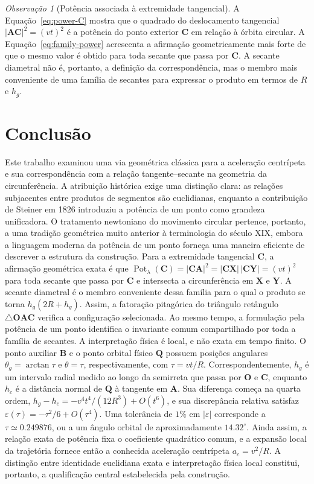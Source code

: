 \documentclass[12pt,a4paper]{article}
\newcommand{\pt}[1]{\mathbf{#1}}
\newcommand{\seglen}[1]{\lvert\mathbf{#1}\rvert}
\DeclareMathOperator{\Pot}{Pot}
\numberwithin{equation}{section}
\theoremstyle{remark}
\newtheorem{remark}{Observação}[section]
\begin{document}
\begin{remark}[Potência associada à extremidade tangencial]
\label{rem:ac-power}
A Equação~\eqref{eq:power-C} mostra que o quadrado do deslocamento tangencial $\seglen{AC}^{2}=(vt)^2$ é a potência do ponto exterior $\pt{C}$ em relação à órbita circular. A Equação~\eqref{eq:family-power} acrescenta a afirmação geometricamente mais forte de que o mesmo valor é obtido para toda secante que passa por $\pt{C}$. A secante diametral não é, portanto, a definição da correspondência, mas o membro mais conveniente de uma família de secantes para expressar o produto em termos de $R$ e $h_g$.
\end{remark}

\section{Conclusão}

Este trabalho examinou uma via geométrica clássica para a aceleração centrípeta e sua correspondência com a relação tangente--secante na geometria da circunferência. A atribuição histórica exige uma distinção clara: as relações subjacentes entre produtos de segmentos são euclidianas, enquanto a contribuição de Steiner em 1826 \cite{steiner1826einige} introduziu a potência de um ponto como grandeza unificadora. O tratamento newtoniano do movimento circular pertence, portanto, a uma tradição geométrica muito anterior à terminologia do século XIX, embora a linguagem moderna da potência de um ponto forneça uma maneira eficiente de descrever a estrutura da construção. Para a extremidade tangencial $\pt{C}$, a afirmação geométrica exata é que $\Pot_{\lambda}(\pt{C})=\seglen{CA}^{2}=\seglen{CX}\,\seglen{CY}=(vt)^2$ para toda secante que passa por $\pt{C}$ e intersecta a circunferência em $\pt{X}$ e $\pt{Y}$. A secante diametral é o membro conveniente dessa família para o qual o produto se torna $h_g(2R+h_g)$. Assim, a fatoração pitagórica do triângulo retângulo $\triangle \mathbf{OAC}$ verifica a configuração selecionada. Ao mesmo tempo, a formulação pela potência de um ponto identifica o invariante comum compartilhado por toda a família de secantes. A interpretação física é local, e não exata em tempo finito. O ponto auxiliar $\pt{B}$ e o ponto orbital físico $\pt{Q}$ possuem posições angulares $\theta_g=\arctan\tau$ e $\theta=\tau$, respectivamente, com $\tau=vt/R$. Correspondentemente, $h_g$ é um intervalo radial medido ao longo da semirreta que passa por $\pt{O}$ e $\pt{C}$, enquanto $h_c$ é a distância normal de $\pt{Q}$ à tangente em $\pt{A}$. Sua diferença começa na quarta ordem, $h_g-h_c=-v^4t^4/(12R^3)+O(t^6)$, e sua discrepância relativa satisfaz $\varepsilon(\tau)=-\tau^2/6+O(\tau^4)$. Uma tolerância de $1\%$ em $|\varepsilon|$ corresponde a $\tau\simeq0.249876$, ou a um ângulo orbital de aproximadamente $14.32^{\circ}$. Ainda assim, a relação exata de potência fixa o coeficiente quadrático comum, e a expansão local da trajetória fornece então a conhecida aceleração centrípeta $a_c=v^2/R$. A distinção entre identidade euclidiana exata e interpretação física local constitui, portanto, a qualificação central estabelecida pela construção.
\end{document}
